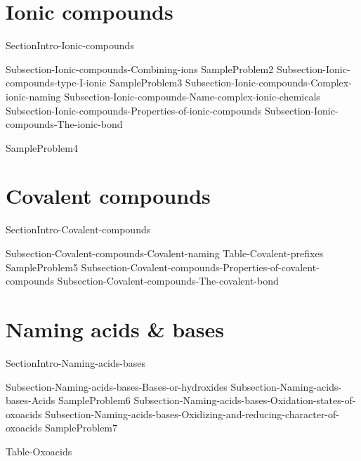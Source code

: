 \documentclass[main.tex]{subfiles}
\newcommand\chapterlabel{Ch-naming}\setcounter{figurenewcounter}{0}\setcounter{tablenewcounter}{0}\setcounter{formulanewcounter}{0}
\begin{document}
\section{Ionic compounds}
{SectionIntro-Ionic-compounds}
\sloppy \begin{description}
{Subsection-Ionic-compounds-Combining-ions}
{SampleProblem2}
{Subsection-Ionic-compounds-type-I-ionic}
{SampleProblem3}
{Subsection-Ionic-compounds-Complex-ionic-naming}
{Subsection-Ionic-compounds-Name-complex-ionic-chemicals}
{Subsection-Ionic-compounds-Properties-of-ionic-compounds}
{Subsection-Ionic-compounds-The-ionic-bond}
\end{description}
{SampleProblem4}
\section{Covalent compounds}
{SectionIntro-Covalent-compounds}
\sloppy \begin{description}
{Subsection-Covalent-compounds-Covalent-naming}
 {Table-Covalent-prefixes}	
{SampleProblem5}
{Subsection-Covalent-compounds-Properties-of-covalent-compounds}
{Subsection-Covalent-compounds-The-covalent-bond}
\end{description}
\section{Naming acids \& bases}
{SectionIntro-Naming-acids-bases}
\sloppy \begin{description}
{Subsection-Naming-acids-bases-Bases-or-hydroxides}
{Subsection-Naming-acids-bases-Acids}
{SampleProblem6}
{Subsection-Naming-acids-bases-Oxidation-states-of-oxoacids}
{Subsection-Naming-acids-bases-Oxidizing-and-reducing-character-of-oxoacids}
{SampleProblem7}
\end{description}
 {Table-Oxoacids}
\end{document}
